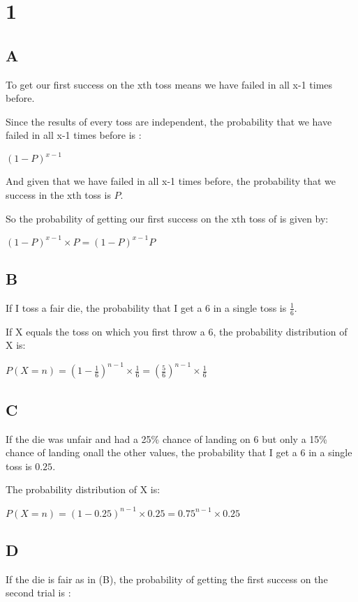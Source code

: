 \documentclass{article}
\begin{document}
	\section*{1}
	
	\subsection*{A}
	
	To get our first success on the xth toss means we have failed in all x-1 times before. 
	
	Since the results of every toss are independent, the probability that we have failed in all x-1 times before is : 
	
	$(1-P)^{x-1}$
	
	And given that we have failed in all x-1 times before, the probability that we success in the xth toss is $P$.
	
	So the probability of getting our first success on the xth toss of is given by:
	
	$(1-P)^{x-1}\times P=(1-P)^{x-1}P$
	
	\subsection*{B}
	
	If I toss a fair die, the probability that I get a 6 in a single toss is $\frac{1}{6}$.
	
	If X equals the toss on which you first throw a 6, the probability distribution of X is:
	
	$P(X=n)=(1-\frac{1}{6})^{n-1}\times \frac{1}{6}=(\frac{5}{6})^{n-1}\times\frac{1}{6}$
	
	\subsection*{C}
	
	If the die was unfair and had a 25\% chance of landing on 6 but only a 15\% chance of landing onall the other values, the probability that I get a 6 in a single toss is $0.25$.
	
	The probability distribution of X is:
	
	$P(X=n)=(1-0.25)^{n-1}\times 0.25=0.75^{n-1}\times 0.25$
	
	\subsection*{D}
	
	If the die is fair as in (B), the probability of getting the first success on the second trial is :
	
\end{document}
